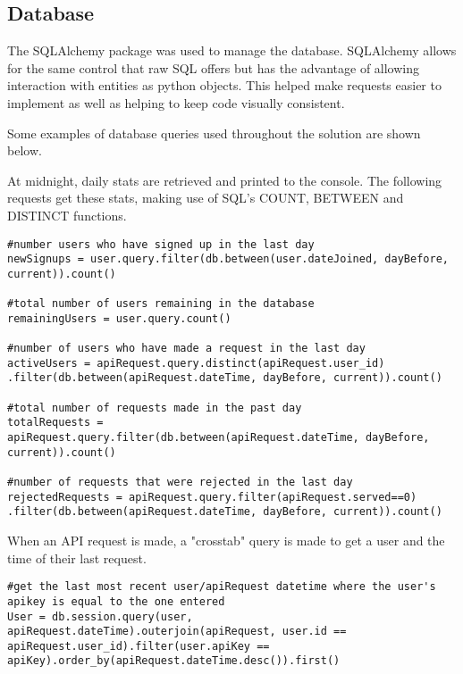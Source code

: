         \subsection{Database}

        The SQLAlchemy package was used to manage the database. SQLAlchemy allows for the same control that raw SQL offers but has the advantage of allowing interaction with entities as python objects. This helped make requests easier to implement as well as helping to keep code visually consistent.

        Some examples of database queries used throughout the solution are shown below.

        At midnight, daily stats are retrieved and printed to the console. The following requests get these stats, making use of SQL's COUNT, BETWEEN and DISTINCT functions.

        \begin{verbatim}
#number users who have signed up in the last day
newSignups = user.query.filter(db.between(user.dateJoined, dayBefore, current)).count()

#total number of users remaining in the database
remainingUsers = user.query.count()

#number of users who have made a request in the last day
activeUsers = apiRequest.query.distinct(apiRequest.user_id) .filter(db.between(apiRequest.dateTime, dayBefore, current)).count()

#total number of requests made in the past day
totalRequests = apiRequest.query.filter(db.between(apiRequest.dateTime, dayBefore, current)).count()

#number of requests that were rejected in the last day 
rejectedRequests = apiRequest.query.filter(apiRequest.served==0) .filter(db.between(apiRequest.dateTime, dayBefore, current)).count()
        \end{verbatim}
        
        When an API request is made, a "crosstab" query is made to get a user and the time of their last request.

        \begin{verbatim}
#get the last most recent user/apiRequest datetime where the user's apikey is equal to the one entered
User = db.session.query(user, apiRequest.dateTime).outerjoin(apiRequest, user.id == apiRequest.user_id).filter(user.apiKey == apiKey).order_by(apiRequest.dateTime.desc()).first()
        \end{verbatim}


